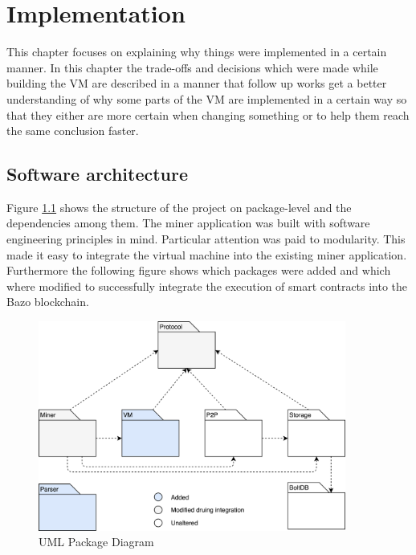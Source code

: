 \chapter{Implementation}
\thispagestyle{main} %
This chapter focuses on explaining why things were implemented in a certain manner. In this chapter the trade-offs and decisions which were made while building the VM are described in a manner that follow up works get a better understanding of why some parts of the VM are implemented in a certain way so that they either are more certain when changing something or to help them reach the same conclusion faster.

\section{Software architecture}
Figure \ref{package overview} shows the structure of the project on package-level and the dependencies among them. The miner application was built with software engineering principles in mind. Particular attention was paid to modularity. This made it easy to integrate the virtual machine into the existing miner application. Furthermore the following figure shows which packages were added and which where modified to successfully integrate the execution of smart contracts into the Bazo blockchain.
\begin{figure}[H]
	\begin{center}
	\includegraphics[width=0.9\textwidth]{./images/package-diagram}
	\caption{UML Package Diagram}
	\label{package overview}
	\end{center}
  \end{figure}

